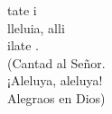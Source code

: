 \begin{cancion}%
	tate i\\
	lleluia, alli\\
	ilate .\\
(Cantad al Señor.\\
¡Aleluya, aleluya!\\
 Alegraos en Dios)\\
\end{cancion}%
